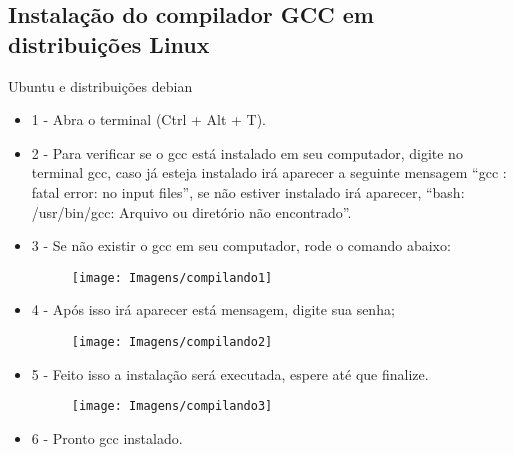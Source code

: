\documentclass[12pt]{article}
\begin{document}
\subsection {Instalação do compilador GCC em distribuições Linux}
Ubuntu e distribuições debian
\begin{itemize}
\item 1 - Abra o terminal (Ctrl + Alt + T).
\item 2 - Para verificar se o gcc está instalado em seu computador, digite no terminal gcc, caso já esteja instalado irá aparecer a seguinte mensagem “gcc : fatal error: no input files”, se não estiver instalado irá aparecer, “bash: /usr/bin/gcc: Arquivo ou diretório não encontrado”.
\item 3 - Se não existir o gcc em seu computador, rode o comando abaixo:
\begin{figure}[!htb]
     \centering
     \texttt{[image: Imagens/compilando1]}
     \label{Label de referência para a imagem}
\end{figure}
 
\item 4 - Após isso irá aparecer está mensagem, digite sua senha;

\begin{figure}[!htb]
     \centering
     \texttt{[image: Imagens/compilando2]}
     \label{Label de referência para a imagem}
\end{figure}

\item 5 - Feito isso a instalação será executada, espere até que finalize.

\begin{figure}[!htb]
     \centering
     \texttt{[image: Imagens/compilando3]}
     \label{Label de referência para a imagem}
\end{figure}

\item 6 - Pronto gcc instalado.

\end{itemize}

\newpage
\end{document}
